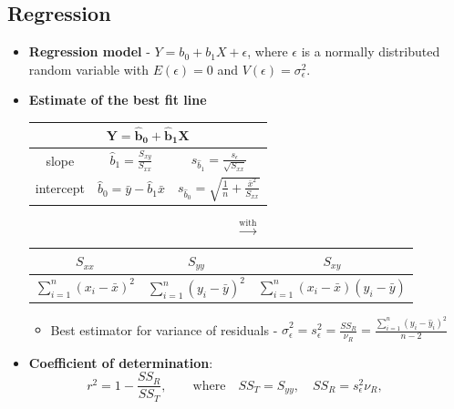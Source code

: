 \documentclass{article}
\begin{document}
\subsection*{Regression}
\begin{itemize}
    \item \textbf{Regression model} - $Y = b_{0} + b_{1}X + \epsilon$, where $\epsilon$ is a normally distributed random variable with $E(\epsilon) = 0$ and $V(\epsilon) = \sigma_{\epsilon}^{2}$.
    \item \textbf{Estimate of the best fit line}
    
    \begin{minipage}{.45\textwidth}
    \begin{table}[H] \centering
    \begin{tabular}{c|c|c}
    \multicolumn{3}{c}{$\mathbf{Y=\hat{b}_{0}+\hat{b}_{1}X}$}\\ \hline
    slope & $\displaystyle \hat{b}_{1} = \frac{S_{xy}}{S_{xx}}$ & $\displaystyle s_{\hat{b}_{1}} = \frac{s_{\epsilon}}{\sqrt{S_{xx}}}$\\ \hline
    intercept & $\displaystyle \hat{b}_{0} = \bar{y}-\hat{b}_{1}\bar{x} $ & $\displaystyle s_{\hat{b}_{0}} = \sqrt{\frac{1}{n}+\frac{\bar{x}^{2}}{S_{xx}}}$
    \end{tabular}\end{table}
    \end{minipage}
    \begin{minipage}{.05\textwidth}\[\xrightarrow{\text{with}}\]
    \end{minipage}
    \begin{minipage}{.45\textwidth}
    \begin{tabular}{c|c|c} \centering
    $S_{xx}$ & $S_{yy}$ & $S_{xy}$ \\ \hline
    $\displaystyle \sum_{i=1}^{n}(x_{i}-\bar{x})^{2}$ & $\displaystyle \sum_{i=1}^{n}(y_{i}-\bar{y})^{2}$ & $\displaystyle \sum_{i=1}^{n}(x_{i}-\bar{x})(y_{i}-\bar{y})$ 
    \end{tabular}\end{minipage}
    \begin{itemize}
        \item Best estimator for variance of residuals -  $\displaystyle \hat{\sigma}_{\epsilon}^{2} = s_{\epsilon}^{2} = \frac{SS_{R}}{\nu_{R}} = \frac{\sum_{i=1}^{n}(y_{i}-\hat{y}_{i})^{2}}{n-2}$
    \end{itemize}
    
    \item \textbf{Coefficient of determination}: \[r^{2} = 1-\frac{SS_{R}}{SS_{T}}, \quad \quad \text{where} \quad SS_{T}=S_{yy}, \quad SS_{R}=s_{\epsilon}^{2}\nu_{R}, \quad \quad \]
    

\end{itemize}
\end{document}
